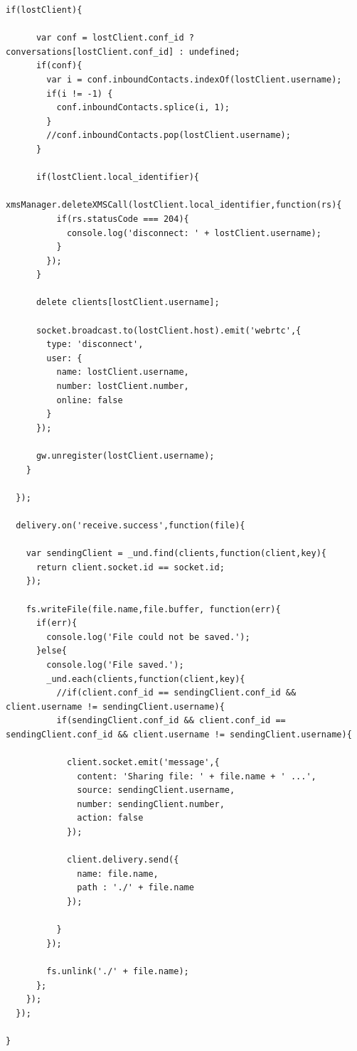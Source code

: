 \begin{appendices}
\begin{lstlisting}[caption={socket.js on Application Server},label={code:server_socket}]
    if(lostClient){

      var conf = lostClient.conf_id ? conversations[lostClient.conf_id] : undefined;
      if(conf){
        var i = conf.inboundContacts.indexOf(lostClient.username);
        if(i != -1) {
          conf.inboundContacts.splice(i, 1);
        }
        //conf.inboundContacts.pop(lostClient.username);
      }

      if(lostClient.local_identifier){
        xmsManager.deleteXMSCall(lostClient.local_identifier,function(rs){
          if(rs.statusCode === 204){
            console.log('disconnect: ' + lostClient.username);
          }
        });
      }

      delete clients[lostClient.username];

      socket.broadcast.to(lostClient.host).emit('webrtc',{
        type: 'disconnect',
        user: {
          name: lostClient.username,
          number: lostClient.number,
          online: false
        }
      });

      gw.unregister(lostClient.username);
    }

  });

  delivery.on('receive.success',function(file){

    var sendingClient = _und.find(clients,function(client,key){
      return client.socket.id == socket.id;
    });

    fs.writeFile(file.name,file.buffer, function(err){
      if(err){
        console.log('File could not be saved.');
      }else{
        console.log('File saved.');
        _und.each(clients,function(client,key){
          //if(client.conf_id == sendingClient.conf_id && client.username != sendingClient.username){
          if(sendingClient.conf_id && client.conf_id == sendingClient.conf_id && client.username != sendingClient.username){

            client.socket.emit('message',{
              content: 'Sharing file: ' + file.name + ' ...',
              source: sendingClient.username,
              number: sendingClient.number,
              action: false
            });

            client.delivery.send({
              name: file.name,
              path : './' + file.name
            });

          }
        });

        fs.unlink('./' + file.name);
      };
    });
  });

}
\end{lstlisting}



\end{appendices}
